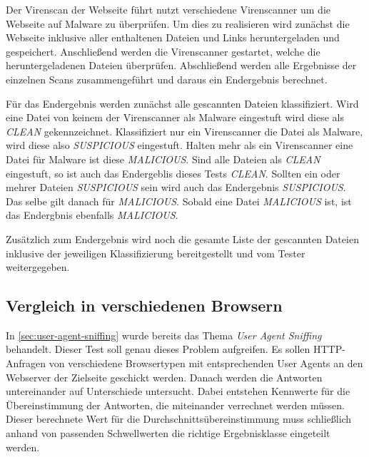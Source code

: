 Der Virenscan der Webseite führt nutzt verschiedene Virenscanner um die Webseite auf Malware zu überprüfen. Um dies zu realisieren wird zunächst die Webseite inklusive aller enthaltenen Dateien und Links heruntergeladen und gespeichert. Anschließend werden die Virenscanner gestartet, welche die heruntergeladenen Dateien überprüfen. Abschließend werden alle Ergebnisse der einzelnen Scans zusammengeführt und daraus ein Endergebnis berechnet.

Für das Endergebnis werden zunächst alle gescannten Dateien klassifiziert. Wird eine Datei von keinem der Virenscanner als Malware eingestuft wird diese als \textit{CLEAN} gekennzeichnet. Klassifiziert nur ein Virenscanner die Datei als Malware, wird diese also \textit{SUSPICIOUS} eingestuft. Halten mehr als ein Virenscanner eine Datei für Malware ist diese \textit{MALICIOUS}. Sind alle Dateien als \textit{CLEAN} eingestuft, so ist auch das Endergeblis dieses Tests \textit{CLEAN}. Sollten ein oder mehrer Dateien \textit{SUSPICIOUS} sein wird auch das Endergebnis \textit{SUSPICIOUS}. Das selbe gilt danach für \textit{MALICIOUS}. Sobald eine Datei \textit{MALICIOUS} ist, ist das Endergbnis ebenfalls \textit{MALICIOUS}.

Zusätzlich zum Endergebnis wird noch die gesamte Liste der gescannten Dateien inklusive der jeweiligen Klassifizierung bereitgestellt und vom Tester weitergegeben.

\subsection{Vergleich in verschiedenen Browsern}

In \autoref{sec:user-agent-sniffing} wurde bereits das Thema \textit{User Agent Sniffing} behandelt.
Dieser Test soll genau dieses Problem aufgreifen.
Es sollen \ac{HTTP}-Anfragen von verschiedene Browsertypen mit entsprechenden User Agents an den Webserver der Zielseite geschickt werden.
Danach werden die Antworten untereinander auf Unterschiede untersucht. Dabei entstehen Kennwerte für die Übereinstimmung der Antworten, die miteinander verrechnet werden müssen.
Dieser berechnete Wert für die Durchschnittsübereinstimmung muss schließlich anhand von passenden Schwellwerten die richtige Ergebnisklasse eingeteilt werden.


